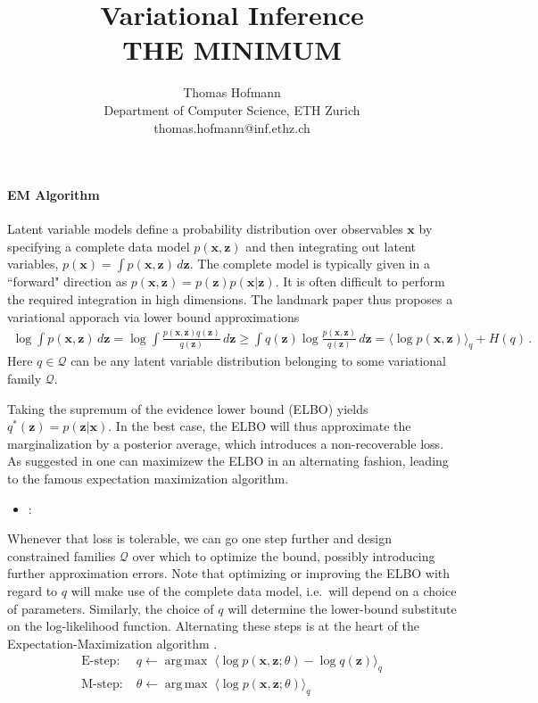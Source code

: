 \documentclass{article}
\title{
	Variational Inference  \\ {\normalsize THE MINIMUM }
}
\author{
	Thomas Hofmann \\[1mm] Department of Computer Science, ETH Zurich \\ thomas.hofmann@inf.ethz.ch
}
\newcommand{\x}{{\mathbf x}}
\newcommand{\z}{{\mathbf z}}
\DeclareMathOperator*{\argmax}{arg\,max}
\begin{document}
\maketitle 

\paragraph{EM Algorithm} Latent variable models define a probability distribution over observables $\x$ by specifying a complete data model $p(\x,\z)$ and then integrating out latent variables, $p(\x) = \int p(\x,\z) \, d\z$. The complete model is typically given  in a ``forward" direction as $p(\x,\z) = p(\z) p(\x|\z)$. It is often difficult to perform the required integration in high dimensions. The landmark paper \cite{dempster1977maximum} thus proposes a variational apporach via lower bound approximations
\begin{align}
\log \int p(\x,\z) \, d\z = \log \int \frac{p(\x,\z) q(\z)}{q(\z)} \, d\z \ge \int q(\z) \log \frac{p(\x,\z)}{q(\z)}  \, d\z= \langle \log p(\x,\z) \rangle_q + H(q)\,.
\label{eq:elbow}
\end{align}
Here $q \in \mathcal Q$ can be any latent variable distribution belonging to some variational family $\mathcal Q$. 

Taking the supremum of the evidence lower bound (ELBO) yields $q^*(\z) = p(\z|\x)$. In the best case, the ELBO will thus approximate the marginalization by a posterior average, which introduces a non-recoverable loss. As suggested in \cite{dempster1977maximum} one can maximizew the ELBO in an alternating fashion, leading to the famous expectation maximization algorithm.


\begin{itemize}
\item \cite{paiseley12variational}:
\end{itemize}



\newpage


Whenever that loss is tolerable, we can go one step further and design constrained families $\mathcal Q$ over which to optimize the bound, possibly introducing further approximation errors. Note that optimizing or improving the ELBO with regard to $q$ will make use of the complete data model, i.e.~will depend on a choice of parameters. Similarly, the choice of $q$ will determine the lower-bound substitute on the log-likelihood function. Alternating these steps is at the heart of the Expectation-Maximization algorithm \cite{dempster1977maximum,mclachlan2007algorithm}.
\begin{subequations}
\begin{align}
\text{E-step}: & \; q \leftarrow \argmax \; \langle \log p(\x,\z; \theta) - \log q(\z)\rangle_q  \\
\text{M-step}: & \; \theta \leftarrow \argmax  \; \langle \log p(\x,\z; \theta) \rangle_q 
\end{align}
\end{subequations}
 


\end{document}
